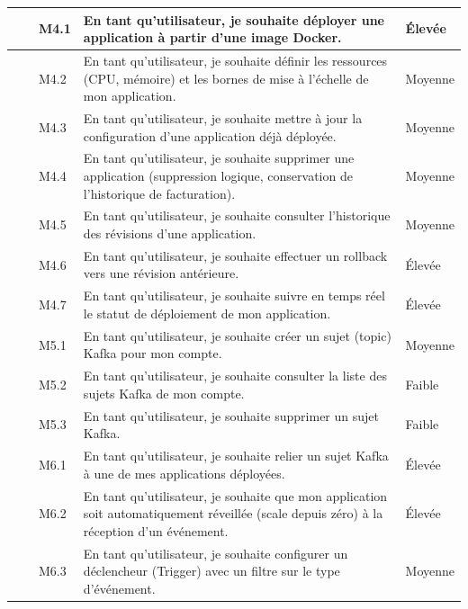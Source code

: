 {\begin{longtable}{|>{\centering\arraybackslash}m{0.8cm}|>{\centering\arraybackslash}m{2.6cm}|>{\centering\arraybackslash}m{1.1cm}|>{\raggedright\arraybackslash}p{6.1cm}|>{\centering\arraybackslash}m{2.3cm}|}
    \multirow{7}{*}{M4} & \multirow{7}{2.6cm}{\centering Gestion des applications}
     & M4.1 & En tant qu'utilisateur, je souhaite déployer une application à partir d'une image Docker. & Élevée \\
    \cline{3-5}
     && M4.2 & En tant qu'utilisateur, je souhaite définir les ressources (CPU, mémoire) et les bornes de mise à l'échelle de mon application. & Moyenne \\
    \cline{3-5}
     && M4.3 & En tant qu'utilisateur, je souhaite mettre à jour la configuration d'une application déjà déployée. & Moyenne \\
    \cline{3-5}
     && M4.4 & En tant qu'utilisateur, je souhaite supprimer une application (suppression logique, conservation de l'historique de facturation). & Moyenne \\
    \cline{3-5}
     && M4.5 & En tant qu'utilisateur, je souhaite consulter l'historique des révisions d'une application. & Moyenne \\
    \cline{3-5}
     && M4.6 & En tant qu'utilisateur, je souhaite effectuer un rollback vers une révision antérieure. & Élevée \\
    \cline{3-5}
     && M4.7 & En tant qu'utilisateur, je souhaite suivre en temps réel le statut de déploiement de mon application. & Élevée \\
    \hline
    
    \multirow{3}{*}{M5} & \multirow{3}{2.6cm}{\centering Messaging Kafka}
     & M5.1 & En tant qu'utilisateur, je souhaite créer un sujet (topic) Kafka pour mon compte. & Moyenne \\
    \cline{3-5}
     && M5.2 & En tant qu'utilisateur, je souhaite consulter la liste des sujets Kafka de mon compte. & Faible \\
    \cline{3-5}
     && M5.3 & En tant qu'utilisateur, je souhaite supprimer un sujet Kafka. & Faible \\
    \hline
    
    \multirow{3}{*}{M6} & \multirow{3}{2.6cm}{\centering Knative Eventing}
     & M6.1 & En tant qu'utilisateur, je souhaite relier un sujet Kafka à une de mes applications déployées. & Élevée \\
    \cline{3-5}
     && M6.2 & En tant qu'utilisateur, je souhaite que mon application soit automatiquement réveillée (scale depuis zéro) à la réception d'un événement. & Élevée \\
    \cline{3-5}
     && M6.3 & En tant qu'utilisateur, je souhaite configurer un déclencheur (Trigger) avec un filtre sur le type d'événement. & Moyenne \\
    \hline
    

\end{longtable}}
